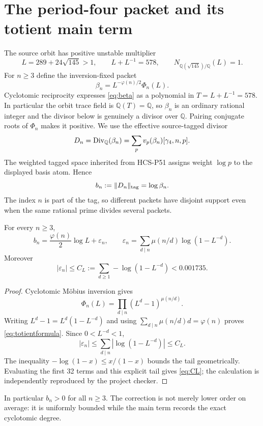 \section{The period-four packet and its totient main term}

The source orbit has positive unstable multiplier
\begin{equation}
L=289+24\sqrt{145}>1,
\qquad L+L^{-1}=578,
\qquad N_{\mathbb Q(\sqrt{145})/\mathbb Q}(L)=1.
\label{eq:L}
\end{equation}
For $n\ge3$ define the inversion-fixed packet
\begin{equation}
\beta_n=L^{-\varphi(n)/2}\Phi_n(L).
\label{eq:beta}
\end{equation}
Cyclotomic reciprocity expresses \eqref{eq:beta} as a polynomial in
$T=L+L^{-1}=578$.  In particular the orbit trace field is
$\mathbb Q(T)=\mathbb Q$, so $\beta_n$ is an ordinary rational integer and
the divisor below is genuinely a divisor over $\mathbb Q$.  Pairing conjugate roots of
$\Phi_n$ makes it positive.  We use the effective source-tagged divisor
\begin{equation}
D_n=\operatorname{Div}_{\mathbb Q}(\beta_n)
=\sum_p v_p(\beta_n)[\gamma_4,n,p].
\label{eq:Dn}
\end{equation}
The weighted tagged space inherited from HCS-P51 assigns weight $\log p$ to
the displayed basis atom.  Hence
\begin{equation}
b_n:=\|D_n\|_{\rm tag}=\log\beta_n.
\label{eq:mass}
\end{equation}
The index $n$ is part of the tag, so different packets have disjoint support
even when the same rational prime divides several packets.

\begin{theorem}
For every $n\ge3$,
\begin{equation}
b_n=\frac{\varphi(n)}2\log L+\varepsilon_n,
\qquad
\varepsilon_n=\sum_{d\mid n}\mu(n/d)\log(1-L^{-d}).
\label{eq:totientformula}
\end{equation}
Moreover
\begin{equation}
|\varepsilon_n|\le C_L:=\sum_{d\ge1}-\log(1-L^{-d})<0.001735.
\label{eq:CL}
\end{equation}
\end{theorem}

\begin{proof}
Cyclotomic M\"obius inversion gives
\[
\Phi_n(L)=\prod_{d\mid n}(L^d-1)^{\mu(n/d)}.
\]
Writing $L^d-1=L^d(1-L^{-d})$ and using
$\sum_{d\mid n}\mu(n/d)d=\varphi(n)$ proves
\eqref{eq:totientformula}.  Since $0<L^{-d}<1$,
\[
|\varepsilon_n|
\le\sum_{d\mid n}|\log(1-L^{-d})|
\le C_L.
\]
The inequality $-\log(1-x)\le x/(1-x)$ bounds the tail geometrically.
Evaluating the first 32 terms and this explicit tail gives
\eqref{eq:CL}; the calculation is independently reproduced by the project
checker.
\end{proof}

In particular $b_n>0$ for all $n\ge3$.  The correction is not merely lower
order on average: it is uniformly bounded while the main term records the
exact cyclotomic degree.
